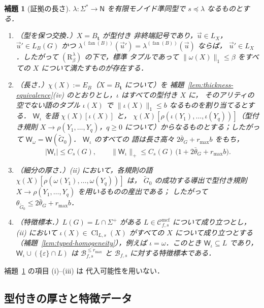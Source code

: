 \documentclass[11pt,a4paper]{ltjsarticle}
\numberwithin{equation}{section}
\theoremstyle{plain}
\newtheorem{lemma}[theorem]{補題}
\theoremstyle{definition}
\theoremstyle{remark}
\newcommand{\Wit}{\mathsf{W}}
\newcommand{\Cmcf}[2]{\mathcal{C}^{\mathrm{mcf}}_{#1,#2}}
\newcommand{\tuple}[1]{\vec{#1}}
\newcommand{\eps}{\varepsilon}
\newcommand{\fan}{\operatorname{fan}}
\theoremstyle{plain}
\begin{document}
\begin{lemma}[証拠の長さ]
\label{lem:witness-length-template}
\label{lem:type-preserving-replacement}
$\lambda:\Sigma^*\to\mathsf N$ を有限モノイド準同型で $s\preceq\lambda$ なるものとする．
\begin{enumerate}[label=\textup{(\roman*)},leftmargin=*]
\item \emph{（型を保つ交換．）}$X=B_{\mathbf t}$ が型付き
非終端記号であり，$\tuple u\in L_X$，$\tuple u'\in L_B(G)$ かつ
$\lambda^{(\fan(B))}(\tuple u')=\lambda^{(\fan(B))}(\tuple u)$ ならば，
$\tuple u'\in L_X$．したがって $(\mathrm R_\beta^\lambda)$ の下で，標準
タプルであって $\|\omega(X)\|_1\le\beta$ をすべての $X$ について満たすものが存在する．
\item \emph{（長さ．）}$\chi(X):=E_B$（$X=B_{\mathbf t}$ について）を
補題~\ref{lem:thickness-equivalence}(iv) のとおりとし，$\iota$ はすべての型付き $X$ に，
そのアリティの空でない語のタプル $\iota(X)$ で $\|\iota(X)\|_1\le b$ なるものを割り当てるとする．
$\Wit_\iota$ を語 $\chi(X)[\iota(X)]$ と，
$\chi(X)[\rho(\iota(Y_1),\ldots,\iota(Y_q))]$（型付き規則
$X\to\rho(Y_1,\ldots,Y_q)$，$q\ge0$ について）からなるものとする；したがって $\Wit_\omega=\Wit(\widetilde G_0)$．
$\Wit_\iota$ のすべての
語は長さ高々 $2\bar\theta_G+r_{\max}b$ をもち，
\[
 |\Wit_\iota|\le C_s(G),\qquad
 \|\Wit_\iota\|_+\le C_s(G)\,\bigl(1+2\bar\theta_G+r_{\max}b\bigr).
\]
\item \emph{（細分の厚さ．）}(ii) において，各規則の語
$\chi(X)[\rho(\omega(Y_1),\ldots,\omega(Y_q))]$ は，
$\widetilde G_0$ の成功する導出で型付き規則 $X\to\rho(Y_1,\ldots,Y_q)$ を用いるものの産出である；
したがって $\theta_{\widetilde G_0}\le2\bar\theta_G+r_{\max}b$．
\item \emph{（特徴標本．）}$L(G)=L\cap\Sigma^+$ がある
$L\in\Cmcf{f}{s}$ について成り立つとし，\textup{(ii)} において $\iota(X)\in\operatorname{Cl}_{L,s}(X)$ がすべての
$X$ について成り立つとする（補題~\ref{lem:typed-homogeneity}），例えば $\iota=\omega$．このとき
$\Wit_\iota\subseteq L$ であり，$\Wit_\iota\cup(\{\eps\}\cap L)$ は
$\mathcal B^{\le r_{\max}}_{f,s}$ と $\mathcal B_{f,s}$ に対する特徴標本である．
\end{enumerate}
\end{lemma}

補題~\ref{lem:witness-length-template} の項目 (i)--(iii) は
代入可能性を用いない．


\subsection{型付きの厚さと特徴データ}
\label{subsec:typed-thickness}
\end{document}
